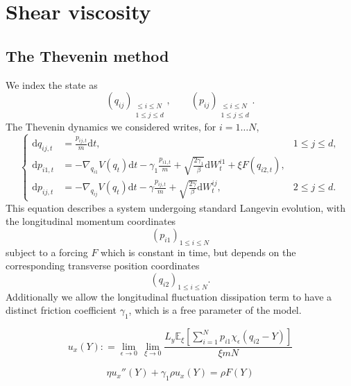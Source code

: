 \documentclass[a4paper,10pt,twoside,leqno]{report}
\newcommand{\E}{\mathbb{E}}
\renewcommand{\leq}{\leqslant}
\newcommand{\dif}{\mathrm{d}}
\newcommand{\defeq}{\mathrel{\mathop:}=}
\newcommand{\1}{\mathbbm{1}}
\begin{document}
    \section{Shear viscosity}
    
    \subsection{The Thevenin method}
    We index the state as \[\left(q_{ij}\right)_{\substack{\leq i\leq N\\1\leq j\leq d}},\qquad \left(p_{ij}\right)_{\substack{\leq i\leq N\\1\leq j\leq d}}.\]
    The Thevenin dynamics we considered writes, for $i=1\dots N$,
    \begin{equation}
        \label{eq:thevenin_sv_dynamics}
        \left\{\begin{aligned}
            \dif q_{ij,t}&=\frac{p_{ij,t}}m\dif t,&1\leq j\leq d,\\
            \dif p_{i1,t}&=-\nabla_{q_{i1}}V(q_t)\dif t-\gamma_1\frac{p_{i1,t}}m+\sqrt{\frac{2\gamma_1}\beta}\dif W_t^{i1}+\xi F(q_{i2,t}),&\\
            \dif p_{ij,t}&=-\nabla_{q_{ij}}V(q_t)\dif t-\gamma \frac{p_{ij,t}}m+\sqrt{\frac{2\gamma}\beta}\dif W_t^{ij},&2\leq j\leq d.
        \end{aligned}\right.
    \end{equation}
    This equation describes a system undergoing standard Langevin evolution, with the longitudinal momentum coordinates 
    \[\left(p_{i1}\right)_{1\leq i\leq N}\]
    subject to a forcing $F$ which is constant in time, but depends on the corresponding transverse position coordinates
    \[\left(q_{i2}\right)_{1\leq i\leq N}.\]
    Additionally we allow the longitudinal fluctuation dissipation term to have a distinct friction coefficient $\gamma_1$, which is a free parameter of the model.
    
    \begin{equation}
        \label{eq:velocity_profile}
        u_x(Y)\defeq \underset{\epsilon \to 0}{\lim} \, \underset{\xi \to 0}{\lim} \frac{L_y\E_\xi \left[\sum_{i=1}^N p_{i1}\chi_\epsilon(q_{i2}-Y)\right]}{\xi mN}
    \end{equation}
    
    \begin{equation}
        \label{eq:shear_viscosity_relation_diffeq}
        \eta u_x''(Y)+\gamma_1 \rho u_x(Y)=\rho F(Y)
    \end{equation}
\end{document}
